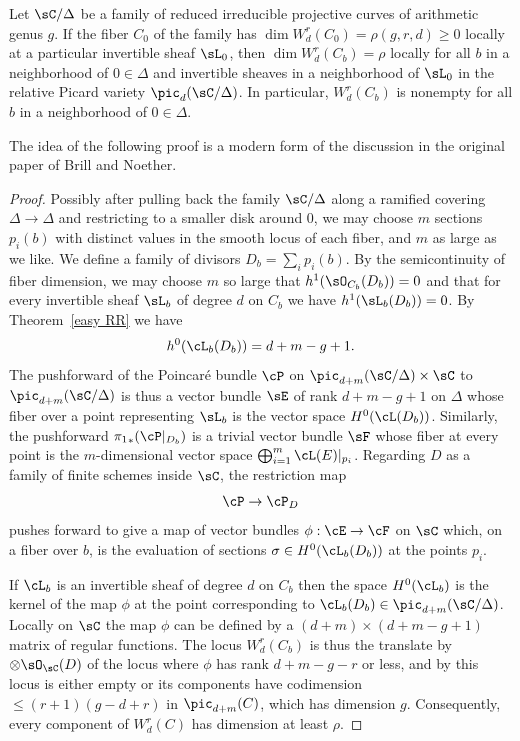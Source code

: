 \begin{theorem}\label{local existence}
Let $\sC/\Delta$ be a family of reduced irreducible projective curves
of arithmetic genus $g$. If
the fiber  $C_0$ of the family has $\dim W^r_d(C_0) = \rho(g,r,d) \geq 0$
locally at a particular invertible sheaf $\sL_{0}$,  then $\dim W^r_d(C_b)
= \rho$ locally for all $b$ in a neighborhood of $0 \in \Delta$ and
invertible sheaves in a neighborhood of $\sL_{0}$
in the
relative Picard variety
%
$\pic_{d}(\sC/\Delta)$. In particular,
$W^r_d(C_b)$ is nonempty for all $b$ in a neighborhood of $0 \in \Delta$.
\unif
\end{theorem}

The idea of the following proof is a modern form of the discussion in
the original paper of Brill and Noether.

\begin{proof}  Possibly after pulling back the family $\sC/\Delta$
along a ramified covering $\Delta\to \Delta$
and restricting to a smaller disk around 0, we may choose $m$ sections
$p_{i}(b)$ with distinct values in the smooth locus of each fiber,
and $m$ as large as we like. We
define a family of divisors $D_{b} = \sum_{i}p_{i}(b)$.
By the
semicontinuity of fiber dimension,
%
we may choose $m$ so large
that $h^{1}(\sO_{C_{b}}(D_{b})) = 0$
and that for every invertible sheaf $\sL_{b}$ of degree $d$ on $C_{b}$
we have
$h^{1}(\sL_{b}(D_{b})) = 0$.
By Theorem~\ref{easy RR} we have
$$
h^0(\cL_{b}(D_{b})) =  d+m - g + 1.
$$
The pushforward of the
Poincar\'e bundle
%
$\cP$
on $\pic_{d+m}(\sC/\Delta)
\times \sC$ to $\pic_{d+m}(\sC/\Delta)$ is thus a vector
bundle $\sE$ of rank $d + m - g + 1$ on $\Delta$ whose fiber over a point
representing $\sL_{b}$ is the vector space $H^0(\cL(D_{b}))$. Similarly,
the pushforward
${\pi_1}_*(\cP|_{D_{b}})$
is a trivial vector bundle
%
$\sF$ whose fiber at every point is the
$m$-dimensional vector space $\bigoplus_{i = 1}^{m} \cL(E)|_{p_i}$. Regarding
$D$ as a family of finite schemes inside $\sC$, the restriction map
$$
\cP  \to \cP_{D}
$$
pushes forward to give a map of vector bundles $\phi : \cE \to \cF$ on
$\sC$ which, on a fiber over $b$, is the evaluation of sections $\sigma
\in H^0(\cL_{b}(D_{b}))$ at the points $p_i$.

If $\cL_{b}$ is an invertible sheaf of degree $d$ on $C_{b}$ then
the space $H^0(\cL_{b})$ is the kernel of the map $\phi$ at the point
corresponding to $\cL_{b}(D_{b}) \in \pic_{d+m}(\sC/\Delta)$. Locally
on $\sC$ the map $\phi$ can be defined by a $(d+m) \times (d+m-g+1)$
matrix of regular functions. The locus $W^r_d(C_{b})$ is
thus the translate
by $\otimes \sO_{\sC}(D)$ of the locus where $\phi$ has rank $d+m-g-r$ or
less, and by \cite[Exercise 10.9]{Eisenbud1995} this locus is either empty
or its components have codimension $\leq (r+1)(g-d+r)$ in $\pic_{d+m}(C)$,
which has dimension $g$. Consequently, every component of $W^r_d(C)$
has dimension at least $\rho$.
\end{proof}


